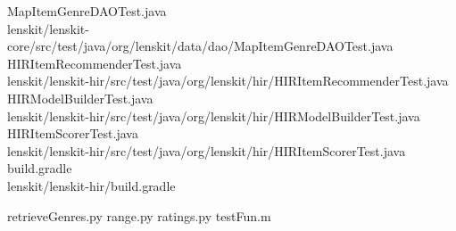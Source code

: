 \begin{scriptsize}
{\en MapItemGenreDAOTest.java\\
lenskit/lenskit-core/src/test/java/org/lenskit/data/dao/MapItemGenreDAOTest.java
 }
 \clearpage
{\en HIRItemRecommenderTest.java \\
lenskit/lenskit-hir/src/test/java/org/lenskit/hir/HIRItemRecommenderTest.java }
\clearpage
{\en HIRModelBuilderTest.java\\
lenskit/lenskit-hir/src/test/java/org/lenskit/hir/HIRModelBuilderTest.java
 }
{\en HIRItemScorerTest.java\\
lenskit/lenskit-hir/src/test/java/org/lenskit/hir/HIRItemScorerTest.java
 }
{\en build.gradle \\
lenskit/lenskit-hir/build.gradle
}
\end{scriptsize}
\clearpage
\begin{scriptsize}
{\en retrieveGenres.py }
{\en range.py
}
{\en ratings.py
}
{\en testFun.m
}
\end{scriptsize}